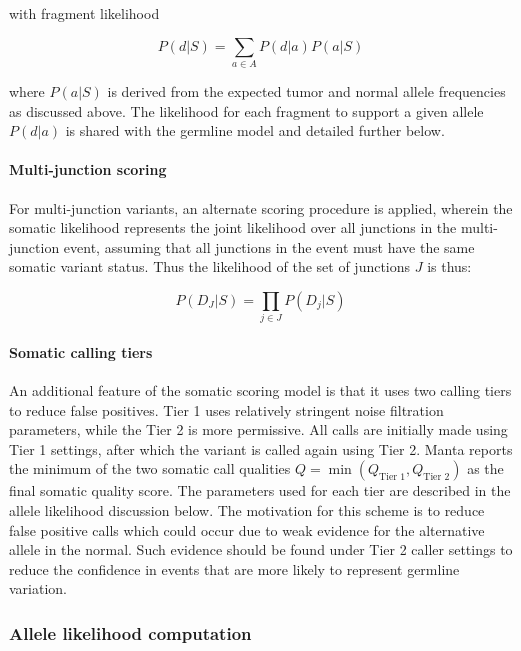 \documentclass{article}
\begin{document}
\noindent
with fragment likelihood

\begin{equation*}
P(d \vert S) = \sum_{a \in A} P(d \vert a) P(a | S)
\end{equation*}

\noindent
where $P(a|S)$ is derived from the expected tumor and normal allele frequencies as discussed above. The likelihood for each fragment to support a given allele $P(d \vert a)$ is shared with the germline model and detailed further below.

\paragraph{Multi-junction scoring}

For multi-junction variants, an alternate scoring procedure is applied, wherein the somatic likelihood represents the joint likelihood over all junctions in the multi-junction event, assuming that all junctions in the event must have the same somatic variant status. Thus the likelihood of the set of junctions $J$ is thus:

\begin{equation*}
P(D_{J} \vert S) = \prod_{j \in J} P(D_{j} \vert S)
\end{equation*}


\paragraph{Somatic calling tiers}

An additional feature of the somatic scoring model is that it uses two calling tiers to reduce false positives. Tier 1 uses relatively stringent noise filtration parameters, while the Tier 2 is more permissive. All calls are initially made using Tier 1 settings, after which the variant is called again using Tier 2. Manta reports the minimum of the two somatic call qualities $Q = \min(Q_{\text{Tier 1}},Q_{\text{Tier 2}})$ as the final somatic quality score. The parameters used for each tier are described in the allele likelihood discussion below. The motivation for this scheme is to reduce false positive calls which could occur due to weak evidence for the alternative allele in the normal. Such evidence should be found under Tier 2 caller settings to reduce the confidence in events that are more likely to represent germline variation.

\subsubsection{Allele likelihood computation}
\end{document}
